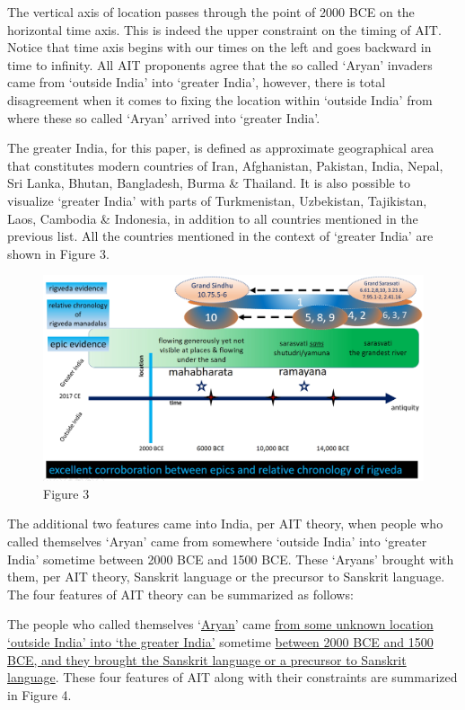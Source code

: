 The vertical axis of location passes through the point of 2000 BCE on the horizontal time axis. This is indeed the upper constraint on the timing of AIT. Notice that time axis begins with our times on the left and goes backward in time to infinity. All AIT proponents agree that the so called ‘Aryan’ invaders came from ‘outside India’ into ‘greater India’, however, there is total disagreement when it comes to fixing the location within ‘outside India’ from where these so called ‘Aryan’ arrived into ‘greater India’.

The greater India, for this paper, is defined as approximate geographical area that constitutes modern countries of Iran, Afghanistan, Pakistan, India, Nepal, Sri Lanka, Bhutan, Bangladesh, Burma \& Thailand. It is also possible to visualize ‘greater India’ with parts of Turkmenistan, Uzbekistan, Tajikistan, Laos, Cambodia \& Indonesia, in addition to all countries mentioned in the previous list. All the countries mentioned in the context of ‘greater India’ are shown in Figure 3.

\begin{figure}
\includegraphics{"images/8-03.jpg"}
\caption{Figure 3}
\end{figure}

The additional two features came into India, per AIT theory, when people who called themselves ‘Aryan’ came from somewhere ‘outside India’ into ‘greater India’ sometime between 2000 BCE and 1500 BCE. These ‘Aryans’ brought with them, per AIT theory, Sanskrit language or the precursor to Sanskrit language. The four features of AIT theory can be summarized as follows:

The people who called themselves ‘\underline{Aryan}’ came \underline{from some unknown location ‘outside India’ into ‘the greater India’} sometime \underline{between 2000 BCE and 1500 BCE, and they brought the Sanskrit language or a precursor to Sanskrit language}. These four features of AIT along with their constraints are summarized in Figure 4.

